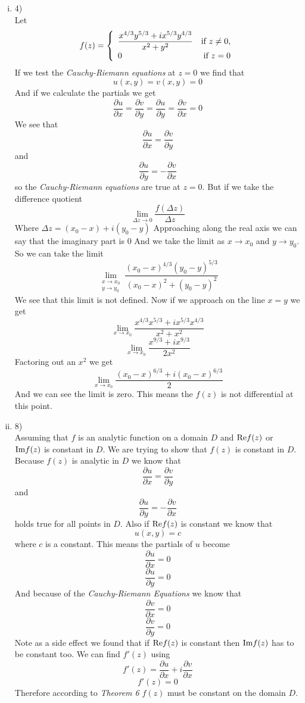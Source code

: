 \documentclass[11pt]{article}
\begin{document}
\begin{enumerate}
\begin{enumerate}[(i)]
\item 4)\\
Let
$$f(z) = \left\{ \begin{array}{lr}
		\dfrac{x^{4/3}y^{5/3}+ix^{5/3}y^{4/3}}{x^2+y^2} &\textnormal{if } z\ne 0,\\
		0 &\textnormal{if } z =0\\
		 \end{array}\right.$$
If we test the \emph{Cauchy-Riemann equations} at $z=0$ we find that 
$$u(x,y) = v(x,y) = 0$$
And if we calculate the partials we get
$$\frac{\partial u}{\partial x}=\frac{\partial v}{\partial y}=\frac{\partial u}{\partial y}=\frac{\partial v}{\partial x}=0$$
We see that
$$\frac{\partial u}{\partial x}=\frac{\partial v}{\partial y}$$
and 
$$\frac{\partial u}{\partial y}=-\frac{\partial v}{\partial x}$$
so the \emph{Cauchy-Riemann equations} are true at $z=0$. But if we take the difference quotient 
$$\lim_{\Delta z\rightarrow 0}\frac{f(\Delta z)}{\Delta z}$$
Where $\Delta z = (x_0 - x) +i(y_0-y)$
Approaching along the real axis we can say that the imaginary part is 0
And we take the limit as $x\rightarrow x_0$ and $y\rightarrow y_0$.
So we can take the limit
$$\lim_{\substack{x\rightarrow x_0\\y\rightarrow y_0}}\dfrac{(x_0-x)^{4/3}(y_0-y)^{5/3}}{(x_0-x)^2+(y_0-y)^2}$$
We see that this limit is not defined. Now if we approach on the line $x=y$ we get
$$\lim_{x\rightarrow x_0}\dfrac{x^{4/3}x^{5/3}+ix^{5/3}x^{4/3}}{x^2+x^2}$$
$$\lim_{x\rightarrow x_0}\dfrac{x^{9/3}+ix^{9/3}}{2x^2}$$
Factoring out an $x^2$ we get
$$\lim_{x\rightarrow x_0}\dfrac{(x_0-x)^{6/3}+i(x_0-x)^{6/3}}{2}$$
And we can see the limit is zero. This means the $f(z)$ is not differential at this point.


\item 8)\\
Assuming that $f$ is an analytic function on a domain $D$ and $\textnormal{Re}f(z)$ or $\textnormal{Im}f(z)$ is constant in $D$. We are trying to show that $f(z)$ is constant in $D$. 
Because $f(z)$ is analytic in $D$ we know that
$$\frac{\partial u}{\partial x}=\frac{\partial v}{\partial y}$$
and 
$$\frac{\partial u}{\partial y}=-\frac{\partial v}{\partial x}$$
holds true for all points in $D$. Also if $\textnormal{Re}f(z)$ is constant we know that 
$$u(x,y) = c$$
where $c$ is a constant. This means the partials of $u$ become
$$\frac{\partial u}{\partial x}=0$$
$$\frac{\partial u}{\partial y}=0$$
And because of the \emph{Cauchy-Riemann Equations} we know that 
$$\frac{\partial v}{\partial x}=0$$
$$\frac{\partial v}{\partial y}=0$$
Note as a side effect we found that if $\textnormal{Re}f(z)$ is constant then $\textnormal{Im}f(z)$ has to be constant too. We can find $f'(z)$ using
$$f'(z) = \frac{\partial u}{\partial x} + i\frac{\partial v}{\partial x}$$
$$f'(z) = 0$$
Therefore according to \emph{Theorem 6} $f(z)$ must be constant on the domain $D$.
\end{enumerate}


\end{enumerate}
\end{document}
